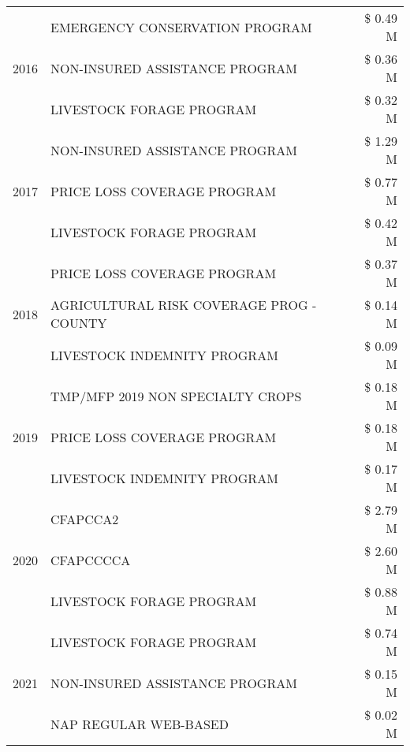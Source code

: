 \begin{tabular}{llr}
\multirow[t]{3}{*}{2016} & EMERGENCY CONSERVATION PROGRAM & \$ 0.49 M \\
 & NON-INSURED ASSISTANCE PROGRAM & \$ 0.36 M \\
 & LIVESTOCK FORAGE PROGRAM & \$ 0.32 M \\
\cline{1-3}
\multirow[t]{3}{*}{2017} & NON-INSURED ASSISTANCE PROGRAM & \$ 1.29 M \\
 & PRICE LOSS COVERAGE PROGRAM & \$ 0.77 M \\
 & LIVESTOCK FORAGE PROGRAM & \$ 0.42 M \\
\cline{1-3}
\multirow[t]{3}{*}{2018} & PRICE LOSS COVERAGE PROGRAM & \$ 0.37 M \\
 & AGRICULTURAL RISK COVERAGE PROG - COUNTY & \$ 0.14 M \\
 & LIVESTOCK INDEMNITY PROGRAM & \$ 0.09 M \\
\cline{1-3}
\multirow[t]{3}{*}{2019} & TMP/MFP 2019 NON SPECIALTY CROPS & \$ 0.18 M \\
 & PRICE LOSS COVERAGE PROGRAM & \$ 0.18 M \\
 & LIVESTOCK INDEMNITY PROGRAM & \$ 0.17 M \\
\cline{1-3}
\multirow[t]{3}{*}{2020} & CFAPCCA2 & \$ 2.79 M \\
 & CFAPCCCCA & \$ 2.60 M \\
 & LIVESTOCK FORAGE PROGRAM & \$ 0.88 M \\
\cline{1-3}
\multirow[t]{3}{*}{2021} & LIVESTOCK FORAGE PROGRAM & \$ 0.74 M \\
 & NON-INSURED ASSISTANCE PROGRAM & \$ 0.15 M \\
 & NAP REGULAR WEB-BASED & \$ 0.02 M \\
\cline{1-3}
\bottomrule
\end{tabular}
